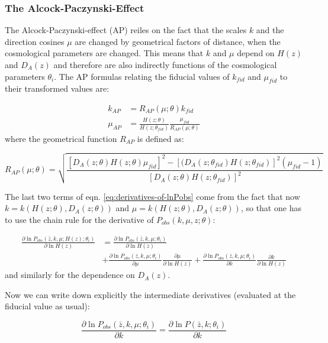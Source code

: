 \subsubsection{The Alcock-Paczynski-Effect\label{sub:The-Alcock-Paczynski-Effect}}

The Alcock-Paczynski-effect (AP) reiles on the fact that the scales
$k$ and the direction cosines $\mu$ are changed by geometrical factors
of distance, when the cosmological parameters are changed. This means
that $k$ and $\mu$ depend on $H(z)$ and $D_{A}(z)$ and therefore
are also indirectly functions of the cosmological parameters $\theta_{i}$.
The AP formulas relating the fiducial values of $k_{fid}$ and $\mu_{fid}$
to their transformed values are:

\begin{align}
k_{AP} & =R_{AP}(\mu;\theta)k_{fid}\\
\mu_{AP} & =\frac{H(z;\theta)}{H(z;\theta_{fid})}\frac{\mu_{fid}}{R_{AP}(\mu;\theta)}
\end{align}
where the geometrical function $R_{AP}$ is defined as:

\begin{equation}
R_{AP}(\mu;\theta)=\sqrt{\frac{[D_{A}(z;\theta)H(z;\theta)\mu_{fid}]^{2}-[(D_{A}(z;\theta_{fid})H(z;\theta_{fid})]^{2}(\mu_{fid}-1)}{[D_{A}(z;\theta)H(z;\theta_{fid})]^{2}}}
\end{equation}


The last two terms of eqn. \ref{eq:derivatives-of-lnPobs} come from
the fact that now $k=k(H(z;\theta),D_{A}(z;\theta))$ and $\mu=k(H(z;\theta),D_{A}(z;\theta))$,
so that one has to use the chain rule for the derivative of $P_{obs}(k,\mu,z;\theta)$:

\begin{align}
\frac{\partial\ln P_{obs}\left(\bar{z},k,\mu;H(z);\theta_{i}\right)}{\partial\ln H(z)} & =\frac{\partial\ln P_{obs}\left(\bar{z},k,\mu;\theta_{i}\right)}{\partial\ln H(z)}\\
 & +\frac{\partial\ln P_{obs}\left(\bar{z},k,\mu;\theta_{i}\right)}{\partial\mu}\frac{\partial\mu}{\partial\ln H(z)}+\frac{\partial\ln P_{obs}\left(\bar{z},k,\mu;\theta_{i}\right)}{\partial k}\frac{\partial k}{\partial\ln H(z)}\nonumber 
\end{align}
and similarly for the dependence on $D_{A}(z)$.

Now we can write down explicitly the intermediate derivatives (evaluated
at the fiducial value as usual):

\begin{equation}
\frac{\partial\ln P_{obs}\left(\bar{z},k,\mu;\theta_{i}\right)}{\partial k}=\frac{\partial\ln P\left(\bar{z},k;\theta_{i}\right)}{\partial k}
\end{equation}


